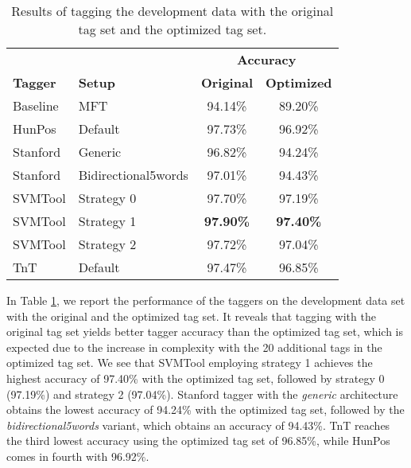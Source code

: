 \documentclass[a4paper,12pt,english]{book}
\begin{document}
\begin{table}
    \vspace{1ex}
    \centering
    \smaller[0.5]
    \begin{tabular}{@{}llcc@{}}
        \toprule
        & & \multicolumn{2}{c}{\textbf{Accuracy}} \\
        \cmidrule(lr){3-4}
        \textbf{Tagger} & \textbf{Setup} & \textbf{Original} &
        \textbf{Optimized} \\
        \midrule
        Baseline & MFT & 94.14\% & 89.20\% \\
        HunPos & Default & 97.73\% & 96.92\% \\
        Stanford & Generic & 96.82\% & 94.24\% \\
        Stanford & Bidirectional5words & 97.01\% & 94.43\% \\
        SVMTool & Strategy 0 & 97.70\% & 97.19\% \\
        SVMTool & Strategy 1 & \textbf{97.90\%} & \textbf{97.40\%} \\
        SVMTool & Strategy 2 & 97.72\% & 97.04\% \\
        TnT & Default & 97.47\% & 96.85\% \\
        \bottomrule
    \end{tabular}
    \caption{Results of tagging the development data with the original tag set
        and the optimized tag set.}
    \label{taggereval}
\end{table}

In Table \ref{taggereval}, we report the performance of the taggers on the
development data set with the original and the optimized tag set. It reveals
that tagging with the original tag set yields better tagger accuracy than the
optimized tag set, which is expected due to the increase in complexity with the
20 additional tags in the optimized tag set. We see that SVMTool employing
strategy 1 achieves the highest accuracy of 97.40\% with the optimized tag set,
followed by strategy 0 (97.19\%) and strategy 2 (97.04\%).  Stanford tagger
with the \emph{generic} architecture obtains the lowest accuracy of 94.24\%
with the optimized tag set, followed by the \emph{bidirectional5words} variant,
which obtains an accuracy of 94.43\%. TnT reaches the third lowest accuracy
using the optimized tag set of 96.85\%, while HunPos comes in fourth with
96.92\%.
\end{document}
